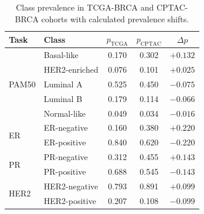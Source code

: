\begin{table}[htbp]
\centering
\caption{Class prevalence in TCGA-BRCA and CPTAC-BRCA cohorts with calculated prevalence shifts.}
\label{tab:prevalence_shift_calc}
\begin{tabular}{llccc}
\toprule
\textbf{Task} & \textbf{Class} & \textbf{$p_{\text{TCGA}}$} & \textbf{$p_{\text{CPTAC}}$} & \textbf{$\Delta p$} \\
\midrule
    \multirow{5}{*}{PAM50} & Basal-like & 0.170 & 0.302 & $+0.132$ \\
     & HER2-enriched & 0.076 & 0.101 & $+0.025$ \\
     & Luminal A & 0.525 & 0.450 & $-0.075$ \\
     & Luminal B & 0.179 & 0.114 & $-0.066$ \\
     & Normal-like & 0.049 & 0.034 & $-0.016$ \\
    \midrule
    \multirow{2}{*}{ER} & ER-negative & 0.160 & 0.380 & $+0.220$ \\
     & ER-positive & 0.840 & 0.620 & $-0.220$ \\
    \midrule
    \multirow{2}{*}{PR} & PR-negative & 0.312 & 0.455 & $+0.143$ \\
     & PR-positive & 0.688 & 0.545 & $-0.143$ \\
    \midrule
    \multirow{2}{*}{HER2} & HER2-negative & 0.793 & 0.891 & $+0.099$ \\
     & HER2-positive & 0.207 & 0.108 & $-0.099$ \\
    \bottomrule
\end{tabular}
\end{table}